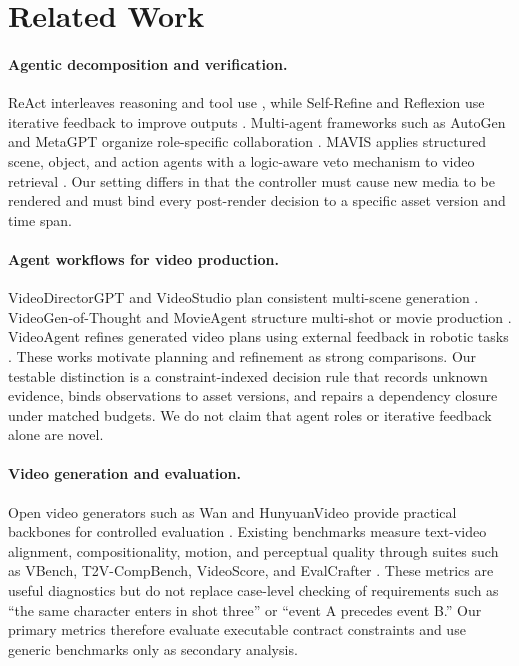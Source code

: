 \documentclass[11pt]{article}
\begin{document}
\section{Related Work}
\label{sec:related}

\paragraph{Agentic decomposition and verification.}
ReAct interleaves reasoning and tool use \citep{yao2023react}, while
Self-Refine and Reflexion use iterative feedback to improve outputs
\citep{madaan2023selfrefine,shinn2023reflexion}. Multi-agent frameworks such as
AutoGen and MetaGPT organize role-specific collaboration
\citep{wu2024autogen,hong2024metagpt}. MAVIS applies structured scene, object,
and action agents with a logic-aware veto mechanism to video retrieval
\citep{zhang-etal-2026-mavis}. Our setting differs in that the controller must cause
new media to be rendered and must bind every post-render decision to a specific
asset version and time span.

\paragraph{Agent workflows for video production.}
VideoDirectorGPT and VideoStudio plan consistent multi-scene generation
\citep{lin2024videodirectorgpt,long2024videostudio}. VideoGen-of-Thought and
MovieAgent structure multi-shot or movie production
\citep{zheng2025videogenofthought,wu2025movieagent}. VideoAgent refines generated
video plans using external feedback in robotic tasks \citep{soni2025videoagent}.
These works motivate planning and refinement as strong comparisons. Our
testable distinction is a constraint-indexed decision rule that records
unknown evidence, binds observations to asset versions, and repairs a
dependency closure under matched budgets. We do not claim that agent roles
or iterative feedback alone are novel.

\paragraph{Video generation and evaluation.}
Open video generators such as Wan and HunyuanVideo provide practical backbones
for controlled evaluation \citep{wan2025wan,kong2025hunyuanvideo}. Existing benchmarks
measure text-video alignment, compositionality, motion, and perceptual quality
through suites such as VBench, T2V-CompBench, VideoScore, and EvalCrafter
\citep{huang2023vbench,sun2025t2vcompbench,he2024videoscore,liu2024evalcrafter}.
These metrics are useful diagnostics but do not replace case-level checking of
requirements such as ``the same character enters in shot three'' or ``event A
precedes event B.'' Our primary metrics therefore evaluate executable contract
constraints and use generic benchmarks only as secondary analysis.
\end{document}
